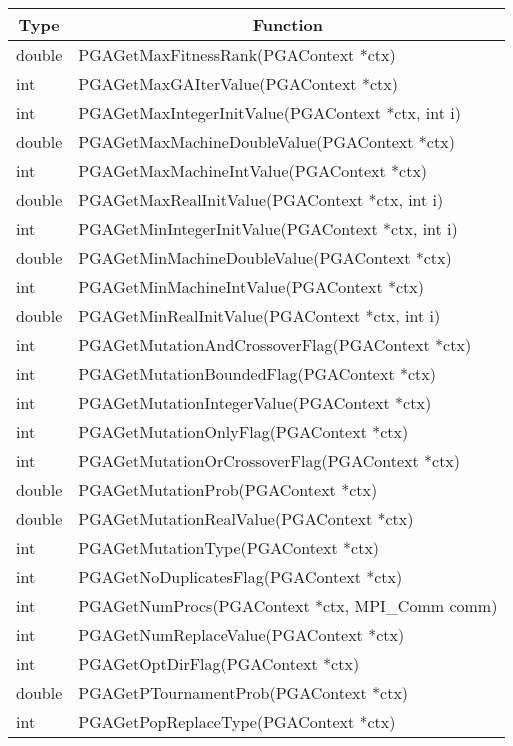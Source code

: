 \documentclass{report}
\begin{document}
\begin{tabular}{|l|l|} \hline\hline
\multicolumn{1}{|c|}{Type} &
\multicolumn{1}{c|}{Function}  \\  \hline\hline
double &  PGAGetMaxFitnessRank(PGAContext *ctx) \\ \hline
int &  PGAGetMaxGAIterValue(PGAContext *ctx) \\ \hline
int &  PGAGetMaxIntegerInitValue(PGAContext *ctx, int i) \\ \hline
double &  PGAGetMaxMachineDoubleValue(PGAContext *ctx) \\ \hline
int &  PGAGetMaxMachineIntValue(PGAContext *ctx) \\ \hline
double &  PGAGetMaxRealInitValue(PGAContext *ctx, int i) \\ \hline
int &  PGAGetMinIntegerInitValue(PGAContext *ctx, int i) \\ \hline
double &  PGAGetMinMachineDoubleValue(PGAContext *ctx) \\ \hline
int &  PGAGetMinMachineIntValue(PGAContext *ctx) \\ \hline
double &  PGAGetMinRealInitValue(PGAContext *ctx, int i) \\ \hline
int &  PGAGetMutationAndCrossoverFlag(PGAContext *ctx) \\ \hline
int &  PGAGetMutationBoundedFlag(PGAContext *ctx) \\ \hline
int &  PGAGetMutationIntegerValue(PGAContext *ctx) \\ \hline
int &  PGAGetMutationOnlyFlag(PGAContext *ctx) \\ \hline
int &  PGAGetMutationOrCrossoverFlag(PGAContext *ctx) \\ \hline
double &  PGAGetMutationProb(PGAContext *ctx) \\ \hline
double &  PGAGetMutationRealValue(PGAContext *ctx) \\ \hline
int &  PGAGetMutationType(PGAContext *ctx) \\ \hline
int &  PGAGetNoDuplicatesFlag(PGAContext *ctx) \\ \hline
int &  PGAGetNumProcs(PGAContext *ctx, MPI\_Comm comm) \\ \hline
int &  PGAGetNumReplaceValue(PGAContext *ctx) \\ \hline
int &  PGAGetOptDirFlag(PGAContext *ctx) \\ \hline
double &  PGAGetPTournamentProb(PGAContext *ctx) \\ \hline
int &  PGAGetPopReplaceType(PGAContext *ctx) \\ \hline

\end{tabular}
\end{document}
